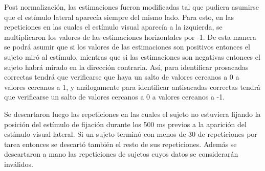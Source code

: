 Post normalización, las estimaciones fueron modificadas tal que pudiera
asumirse que el estímulo lateral aparecía siempre del mismo lado.
Para esto, en las repeticiones en las cuales el estímulo visual aparecía a la
izquierda, se multiplicaron los valores de las estimaciones horizontales por
-1.
De esta manera se podrá asumir que si los valores de las estimaciones son
positivos entonces el sujeto miró al estímulo, mientras que si las estimaciones
son negativas entonces el sujeto habrá mirado en la dirección contraria.
Así, para identificar prosacadas correctas tendrá que verificarse que haya un
salto de valores cercanos a 0 a valores cercanos a 1, y análogamente para
identificar antisacadas correctas tendrá que verificarse un salto de valores
cercanos a 0 a valores cercanos a -1.

Se descartaron luego las repeticiones en las cuales el sujeto no estuviera
fijando la posición del estímulo de fijación durante los 500 ms previos a la
aparición del estímulo visual lateral.
Si un sujeto terminó con menos de 30 de repeticiones por tarea entonces se
descartó también el resto de sus repeticiones.
Además se descartaron a mano las repeticiones de sujetos cuyos datos se
considerarán inválidos.
